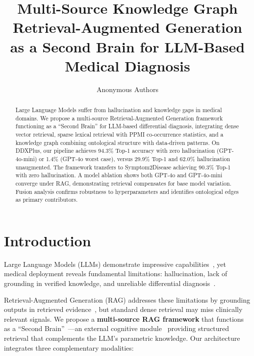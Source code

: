 \documentclass[runningheads]{llncs}
\begin{document}
\title{Multi-Source Knowledge Graph Retrieval-Augmented Generation as a Second Brain for LLM-Based Medical Diagnosis}


\author{Anonymous Authors}

\maketitle

\begin{abstract}
Large Language Models suffer from hallucination and knowledge gaps in medical domains. We propose a multi-source Retrieval-Augmented Generation framework functioning as a ``Second Brain'' for LLM-based differential diagnosis, integrating dense vector retrieval, sparse lexical retrieval with PPMI co-occurrence statistics, and a knowledge graph combining ontological structure with data-driven patterns. On DDXPlus, our pipeline achieves 94.3\% Top-1 accuracy with zero hallucination (GPT-4o-mini) or 1.4\% (GPT-4o worst case), versus 29.9\% Top-1 and 62.0\% hallucination unaugmented. The framework transfers to Symptom2Disease achieving 90.3\% Top-1 with zero hallucination. A model ablation shows both GPT-4o and GPT-4o-mini converge under RAG, demonstrating retrieval compensates for base model variation. Fusion analysis confirms robustness to hyperparameters and identifies ontological edges as primary contributors.

\end{abstract}

\section{Introduction}
\label{sec:introduction}

Large Language Models (LLMs) demonstrate impressive capabilities~\cite{brown2020language,openai2023gpt4}, yet medical deployment reveals fundamental limitations: hallucination, lack of grounding in verified knowledge, and unreliable differential diagnosis~\cite{ji2023survey,singhal2023large}.

Retrieval-Augmented Generation (RAG) addresses these limitations by grounding outputs in retrieved evidence~\cite{lewis2020retrieval,gao2023retrieval}, but standard dense retrieval may miss clinically relevant signals. We propose a \textbf{multi-source RAG framework} that functions as a ``Second Brain''~\cite{clark1998extended}---an external cognitive module~\cite{hutchins1995cognition} providing structured retrieval that complements the LLM's parametric knowledge. Our architecture integrates three complementary modalities:
\end{document}
